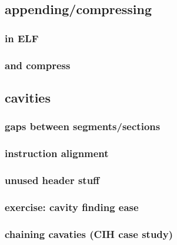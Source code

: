 

\subsection{appending/compressing}




\subsubsection{in ELF}


\subsubsection{and compress}


\subsection{cavities}




\subsubsection{gaps between segments/sections}


\subsubsection{instruction alignment}


\subsubsection{unused header stuff}


\subsubsection{exercise: cavity finding ease}


\subsubsection{chaining cavaties (CIH case study)}


